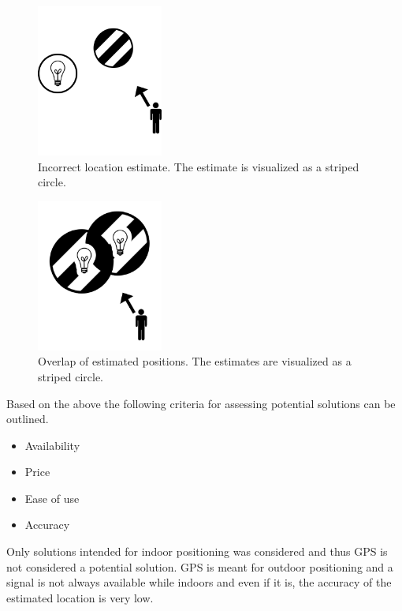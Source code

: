 \begin{figure}[h]
\centering
\includegraphics[height=5cm]{images/incorrect-positioning-estimate.png}
\caption{Incorrect location estimate. The estimate is visualized as a striped circle.}
\label{fig:indoor-positioning:incorrect}
\end{figure}

\begin{figure}[h]
\centering
\includegraphics[height=5cm]{images/positioning-overlap.png}
\caption{Overlap of estimated positions. The estimates are visualized as a striped circle.}
\label{fig:indoor-positioning:overlap}
\end{figure}

Based on the above the following criteria for assessing potential solutions can be outlined.

\begin{itemize}
\item Availability
\item Price
\item Ease of use
\item Accuracy
\end{itemize}

Only solutions intended for indoor positioning was considered and thus GPS is not considered a potential solution. 
GPS is meant for outdoor positioning and a signal is not always available while indoors and even if it is, the accuracy of the estimated location is very low.

